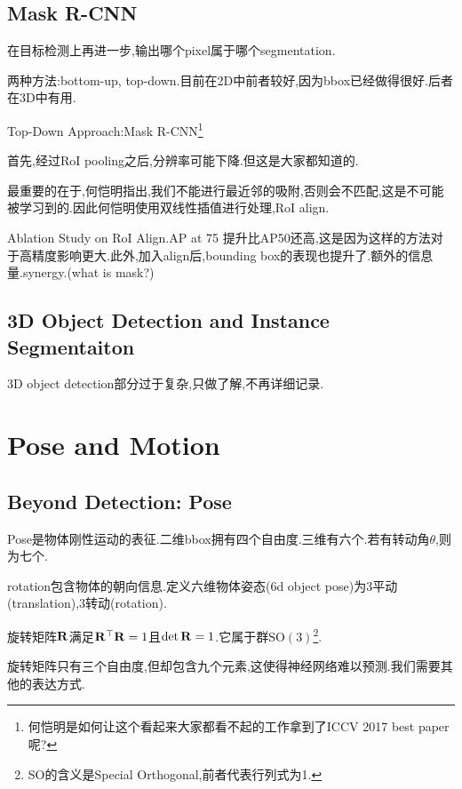 	\subsection{Mask R-CNN}
	在目标检测上再进一步,输出哪个pixel属于哪个segmentation.
	
	两种方法:bottom-up, top-down.目前在2D中前者较好,因为bbox已经做得很好.后者在3D中有用.
	
	Top-Down Approach:Mask R-CNN\footnote{何恺明是如何让这个看起来大家都看不起的工作拿到了ICCV 2017 best paper呢?}
	
	首先,经过RoI pooling之后,分辨率可能下降.但这是大家都知道的.
	
	最重要的在于,何恺明指出,我们不能进行最近邻的吸附,否则会不匹配,这是不可能被学习到的.因此何恺明使用双线性插值进行处理,RoI align.
	
	Ablation Study on RoI Align.AP at 75 提升比AP50还高,这是因为这样的方法对于高精度影响更大.此外,加入align后,bounding box的表现也提升了.额外的信息量.synergy.(what is mask?)
	
	\subsection{3D Object Detection and Instance Segmentaiton}
	3D object detection部分过于复杂,只做了解,不再详细记录.
	
	\clearpage
	\section{Pose and Motion}
	\subsection{Beyond Detection: Pose}
	Pose是物体刚性运动的表征.二维bbox拥有四个自由度.三维有六个.若有转动角$\theta$,则为七个.
	
	rotation包含物体的朝向信息.定义六维物体姿态(6d object pose)为3平动(translation),3转动(rotation).
	
	旋转矩阵$\bold{R}$满足$\bold{R}^\top\bold{R} = 1$且$\det \bold{R} = 1$.它属于群$\mathrm{SO(3)}$\footnote{SO的含义是Special Orthogonal,前者代表行列式为1.}.
	
	旋转矩阵只有三个自由度,但却包含九个元素,这使得神经网络难以预测.我们需要其他的表达方式.
	
